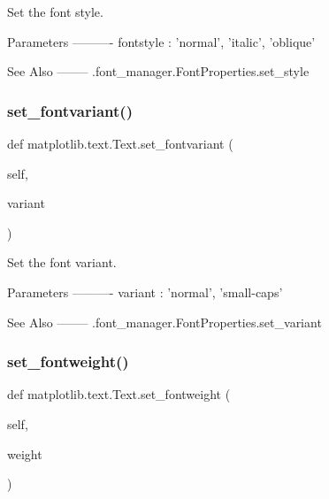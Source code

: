 \begin{DoxyVerb}Set the font style.

Parameters
----------
fontstyle : {'normal', 'italic', 'oblique'}

See Also
--------
.font_manager.FontProperties.set_style
\end{DoxyVerb}
 \mbox{\label{classmatplotlib_1_1text_1_1Text_a354aada9819cf61b087269f2ca038275}} 
\subsubsection{\texorpdfstring{set\+\_\+fontvariant()}{set\_fontvariant()}}
{\footnotesize\ttfamily def matplotlib.\+text.\+Text.\+set\+\_\+fontvariant (\begin{DoxyParamCaption}\item[{}]{self,  }\item[{}]{variant }\end{DoxyParamCaption})}

\begin{DoxyVerb}Set the font variant.

Parameters
----------
variant : {'normal', 'small-caps'}

See Also
--------
.font_manager.FontProperties.set_variant
\end{DoxyVerb}
 \mbox{\label{classmatplotlib_1_1text_1_1Text_a8de130a872844a2fb97909c59a9831ea}} 
\subsubsection{\texorpdfstring{set\+\_\+fontweight()}{set\_fontweight()}}
{\footnotesize\ttfamily def matplotlib.\+text.\+Text.\+set\+\_\+fontweight (\begin{DoxyParamCaption}\item[{}]{self,  }\item[{}]{weight }\end{DoxyParamCaption})}


